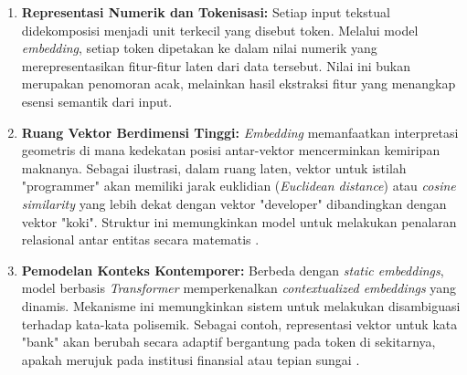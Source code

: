 \begin{enumerate}
    \item \textbf{Representasi Numerik dan Tokenisasi:} Setiap input tekstual didekomposisi menjadi unit terkecil yang disebut token. Melalui model \textit{embedding}, setiap token dipetakan ke dalam nilai numerik yang merepresentasikan fitur-fitur laten dari data tersebut. Nilai ini bukan merupakan penomoran acak, melainkan hasil ekstraksi fitur yang menangkap esensi semantik dari input.
    
    \item \textbf{Ruang Vektor Berdimensi Tinggi:} \textit{Embedding} memanfaatkan interpretasi geometris di mana kedekatan posisi antar-vektor mencerminkan kemiripan maknanya. Sebagai ilustrasi, dalam ruang laten, vektor untuk istilah "programmer" akan memiliki jarak euklidian (\textit{Euclidean distance}) atau \textit{cosine similarity} yang lebih dekat dengan vektor "developer" dibandingkan dengan vektor "koki". Struktur ini memungkinkan model untuk melakukan penalaran relasional antar entitas secara matematis \citep{pennington-etal-2014-glove}.
    
    \item \textbf{Pemodelan Konteks Kontemporer:} Berbeda dengan \textit{static embeddings}, model berbasis \textit{Transformer} memperkenalkan \textit{contextualized embeddings} yang dinamis. Mekanisme ini memungkinkan sistem untuk melakukan disambiguasi terhadap kata-kata polisemik. Sebagai contoh, representasi vektor untuk kata "bank" akan berubah secara adaptif bergantung pada token di sekitarnya, apakah merujuk pada institusi finansial atau tepian sungai \citep{vaswaniAttentionAllYou2023}.
\end{enumerate}